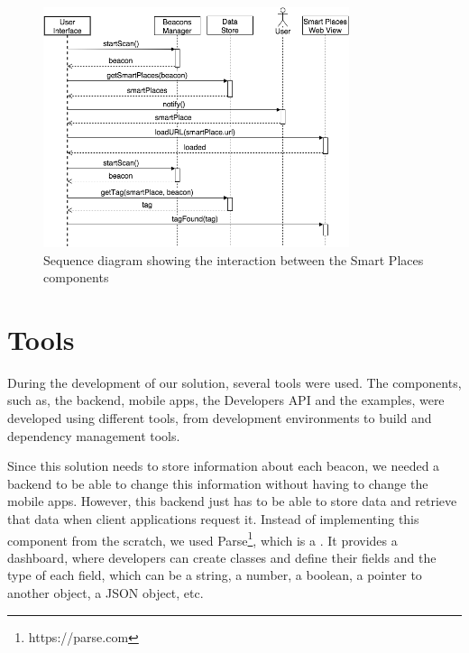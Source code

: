 \begin{figure}[!ht]
  \centering
    \includegraphics[width=0.8\textwidth, keepaspectratio]{images/client_app_sequence}
    \caption[Smart Places Sequence Diagram]{Sequence diagram showing the interaction between the Smart Places components}
    \label{fig:smart_places_sequence}
\end{figure}

\section{Tools}
\label{sec:implementation_tools}
During the development of our solution, several tools were used.
The components, such as, the backend, mobile apps, the Developers \gls{API} and the examples, were developed using different tools, from development environments to build and dependency management tools.

Since this solution needs to store information about each beacon, we
needed a backend to be able to change this information without having
to change the mobile apps.
However, this backend just has to be able to store data and retrieve that
data when client applications request it.
Instead of implementing this component from the scratch, we used
Parse\footnote{https://parse.com}, which is a .
It provides a dashboard, where developers can create classes
and define their fields and the type of each field, which can be a string,
a number, a boolean, a pointer to another object, a \gls{JSON} object, etc.

